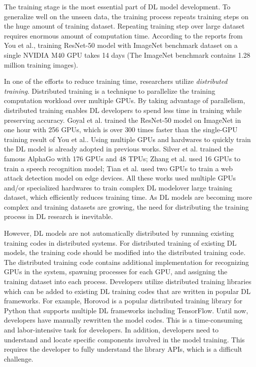 The training stage is the most essential part of DL model development.
To generalize well on the unseen data,
the training process repeats training steps on the huge amount of
training dataset.
Repeating training step over large dataset requires enormous
amount of computation time.
According to the reports from You et al.\cite{imagenettraining2017},
training ResNet-50 model with ImageNet benchmark dataset on a 
single NVIDIA M40 GPU takes 14 days (The ImageNet benchmark\cite{imagenet2014} 
contains 1.28 million training images). 

In one of the efforts to reduce training time, 
researchers utilize \textit{distributed training}.
Distributed training is a technique to parallelize the training computation
workload over multiple GPUs.
By taking advantage of parallelism, distributed training enables DL developers 
to spend less time in training while preserving accuracy.
Goyal et al.\cite{facebook2018} trained the ResNet-50 model on ImageNet
in one hour with 256 GPUs, which is over 300 times faster than the
single-GPU training result of You et al.\cite{imagenettraining2017}.
Using multiple GPUs and hardwares to quickly train the DL model is 
already adopted in previous works.
Silver et al.\cite{Silver2017alphagozero} trained the famous AlphaGo 
with 176 GPUs and 48 TPUs;
Zhang et al.\cite{zhang2019distrspeech} used 16 GPUs to train
a speech recognition model;
Tian et al.\cite{tian2020distrwebattack} used 
two GPUs to train a web attack detection model on edge devices.
All these works used multiple GPUs and/or specialized hardwares 
to train complex DL modelover large training dataset, 
which efficiently reduces training time.
As DL models are becoming more complex and training datasets are growing,
the need for distributing the training process in DL research is inevitable.

However, DL models are not automatically distributed
by runnning existing training codes in distributed systems.
For distributed training of existing DL models,
the training code should be modified into the distributed training code.
The distributed training code contains additional implementation
for recognizing GPUs in the system, spawning processes for each GPU,
and assigning the training dataset into each process.
Developers utilize distributed training libraries which can be
added to existing DL training codes that are written in popular
DL frameworks. For example, Horovod\cite{sergeev2018horovod} is a
popular distributed training library for Python that supports multiple
DL frameworks including TensorFlow.
Until now, developers have manually rewritten the model codes.
This is a time-consuming and labor-intensive task for developers.
In addition, developers need to understand and locate 
specific components involved in the model training.
This requires the developer to fully understand the library APIs,
which is a difficult challenge.

